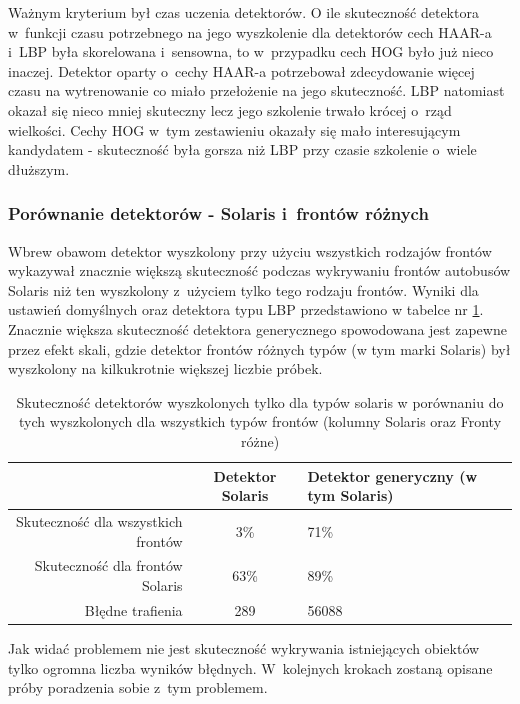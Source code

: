 Ważnym kryterium był czas uczenia detektorów.
O ile skuteczność detektora w~funkcji czasu potrzebnego na jego 
wyszkolenie dla detektorów cech HAAR-a i~LBP była skorelowana i~sensowna,
to w~przypadku cech HOG było już nieco inaczej.
Detektor oparty o~cechy HAAR-a potrzebował
zdecydowanie więcej czasu na wytrenowanie co miało przełożenie 
na jego skuteczność. LBP natomiast okazał się nieco mniej skuteczny
lecz jego szkolenie trwało krócej o~rząd wielkości.
Cechy HOG w~tym zestawieniu okazały się mało interesującym kandydatem
- skuteczność była gorsza niż LBP przy czasie szkolenie o~wiele dłuższym.

\subsubsection{Porównanie detektorów - Solaris i~frontów różnych}

Wbrew obawom detektor wyszkolony przy użyciu wszystkich 
rodzajów frontów 
wykazywał znacznie większą skuteczność podczas wykrywaniu 
frontów autobusów Solaris niż ten
wyszkolony z~użyciem tylko tego rodzaju frontów. Wyniki dla ustawień
domyślnych oraz detektora typu LBP przedstawiono w tabelce nr 
\ref{tab:sol_vs_all}. Znacznie większa skuteczność detektora
generycznego spowodowana jest zapewne przez efekt skali,
gdzie detektor frontów różnych typów (w tym marki Solaris) 
był wyszkolony na kilkukrotnie większej liczbie próbek.

\begin{table}[!h]
    \centering
    \begin{tabular}{r|c|l}
          & Detektor Solaris    & Detektor generyczny (w tym Solaris) \\
          \hline
Skuteczność dla wszystkich frontów & 3\%  & 71\%      \\
Skuteczność dla frontów Solaris    & 63\% & 89\%      \\
Błędne trafienia                   & 289  & 56088    \\
    \end{tabular}
    \caption{Skuteczność detektorów wyszkolonych tylko dla typów
    solaris w porównaniu do tych wyszkolonych dla wszystkich typów frontów
    (kolumny Solaris oraz Fronty różne)}
    \label{tab:sol_vs_all}
\end{table}

Jak widać problemem nie jest skuteczność wykrywania istniejących obiektów
tylko ogromna liczba wyników błędnych. W~kolejnych krokach zostaną opisane
próby poradzenia sobie z~tym problemem.

